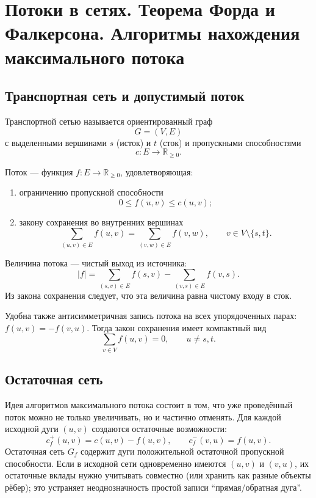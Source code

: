\section{Потоки в сетях. Теорема Форда и Фалкерсона. Алгоритмы нахождения максимального потока}
\label{sec:network-flows}

\subsection{Транспортная сеть и допустимый поток}

Транспортной сетью называется ориентированный граф
\[
    G=(V,E)
\]
с выделенными вершинами $s$ (исток) и $t$ (сток) и пропускными способностями
\[
    c\colon E\to\mathbb R_{\ge0}.
\]

Поток --- функция $f\colon E\to\mathbb R_{\ge0}$, удовлетворяющая:
\begin{enumerate}
 \item ограничению пропускной способности
 \[
    0\le f(u,v)\le c(u,v);
 \]
 \item закону сохранения во внутренних вершинах
 \[
    \sum_{(u,v)\in E}f(u,v)
    =
    \sum_{(v,w)\in E}f(v,w),
    \qquad v\in V\setminus\{s,t\}.
 \]
\end{enumerate}

Величина потока --- чистый выход из источника:
\[
 |f|=
 \sum_{(s,v)\in E}f(s,v)-
 \sum_{(v,s)\in E}f(v,s).
\]
Из закона сохранения следует, что эта величина равна чистому входу в сток.

Удобна также антисимметричная запись потока на всех упорядоченных парах:
$f(u,v)=-f(v,u)$. Тогда закон сохранения имеет компактный вид
\[
    \sum_{v\in V} f(u,v)=0,
    \qquad u\ne s,t.
\]

\subsection{Остаточная сеть}

Идея алгоритмов максимального потока состоит в том, что уже проведённый поток
можно не только увеличивать, но и частично отменять. Для каждой исходной дуги
$(u,v)$ создаются остаточные возможности:
\[
    c_f^{+}(u,v)=c(u,v)-f(u,v),
    \qquad
    c_f^{-}(v,u)=f(u,v).
\]
Остаточная сеть $G_f$ содержит дуги положительной остаточной пропускной
способности. Если в исходной сети одновременно имеются $(u,v)$ и $(v,u)$, их
остаточные вклады нужно учитывать совместно (или хранить как разные объекты
рёбер); это устраняет неоднозначность простой записи ``прямая/обратная дуга''.

